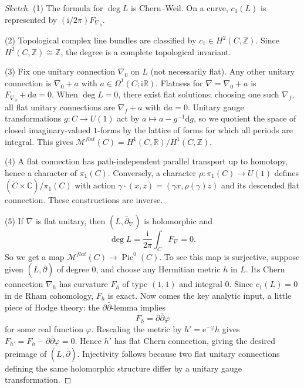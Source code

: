 \documentclass[12pt,letterpaper,reqno]{amsart}
\numberwithin{equation}{section}
\newcommand{\cM}{\ensuremath{\mathcal M}}
\newcommand{\cO}{\ensuremath{\mathcal O}}
\newcommand{\bbR}{\ensuremath{\mathbb R}}
\newcommand{\bbC}{\ensuremath{\mathbb C}}
\newcommand{\bbZ}{\ensuremath{\mathbb Z}}
\newcommand{\I}{{\mathrm i}}
\newcommand{\e}{{\mathrm e}}
\newcommand{\de}{\mathrm{d}}
\newcommand{\ti}[1]{\textit{#1}}
\DeclareMathOperator{\Jac}{Jac}
\begin{document}
\begin{proof}[Sketch]
(1) The formula for $\deg L$ is Chern--Weil.
On a curve, $c_1(L)$ is represented by $(\I/2\pi)F_{\nabla_h}$.

(2) Topological complex line bundles are classified by $c_1 \in H^2(C,\bbZ)$.
Since $H^2(C,\bbZ)\cong \bbZ$, the degree is a complete topological invariant.

(3) Fix one unitary connection $\nabla_0$ on $L$ (not necessarily flat). Any other unitary connection is
$\nabla_0+a$ with $a\in \Omega^1(C;\I\bbR)$.
Flatness for $\nabla=\nabla_0+a$ is $F_{\nabla_0}+\de a=0$.
When $\deg L=0$, there exist flat solutions; choosing one such $\nabla_f$, all flat unitary connections are
$\nabla_f+a$ with $\de a=0$.
Unitary gauge transformations $g:C\to U(1)$ act by
$a\mapsto a-g^{-1}\de g$, so we quotient the space of closed imaginary-valued $1$-forms by the lattice of forms
for which all periods are integral. This gives $\cM^{flat}(C) = H^1(C,\bbR)/H^1(C,\bbZ)$.

(4) A flat connection has path-independent parallel transport up to homotopy, hence a character of $\pi_1(C)$.
Conversely, a character $\rho:\pi_1(C)\to U(1)$ defines
$(\widetilde C\times \bbC)/\pi_1(C)$ with action
$\gamma\cdot(x,z)=(\gamma x,\rho(\gamma)z)$ and its descended flat connection.
These constructions are inverse.

(5) If $\nabla$ is flat unitary, then $(L,\bar\partial_\nabla)$ is holomorphic and
\[
\deg L=\frac{\I}{2\pi}\int_C F_\nabla=0.
\]
So we get a map $\cM^{flat}(C)\to \operatorname{Pic}^0(C)$.
To see this map is surjective, suppose given $(L,\bar\partial)$ of degree $0$, and choose any Hermitian metric $h$
in $L$. Its Chern connection $\nabla_h$ has curvature $F_h$ of type $(1,1)$ and integral $0$.
Since $c_1(L) = 0$ in de Rham cohomology, $F_h$ is exact. Now comes the key analytic input, a little piece of
Hodge theory: the $\partial\bar\partial$-lemma implies
\[
F_h=\partial\bar\partial \varphi
\]
for some real function $\varphi$.
Rescaling the metric by $h' = \e^{-\varphi}h$ gives
$F_{h'} = F_h - \partial\bar\partial\varphi = 0$.
Hence $h'$ has flat Chern connection, giving the desired preimage of $(L,\bar\partial)$.
Injectivity follows because two flat unitary connections defining the same holomorphic structure
differ by a unitary gauge transformation.
\end{proof}

\end{document}
